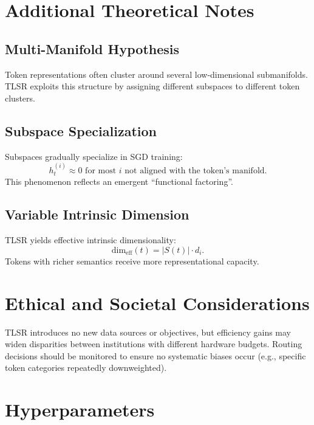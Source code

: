 \documentclass{article}
\theoremstyle{plain}
\theoremstyle{definition}
\theoremstyle{remark}
\begin{document}
\section{Additional Theoretical Notes}

\subsection{Multi-Manifold Hypothesis}
Token representations often cluster around several 
low-dimensional submanifolds.
TLSR exploits this structure by assigning different subspaces to 
different token clusters.

\subsection{Subspace Specialization}
Subspaces gradually specialize in SGD training:
\[
h_t^{(i)} \approx 0 \text{ for most $i$ not aligned with the token's manifold}.
\]
This phenomenon reflects an emergent “functional factoring”.

\subsection{Variable Intrinsic Dimension}
TLSR yields effective intrinsic dimensionality:
\[
\mathrm{dim}_{\mathrm{eff}}(t)
= |S(t)|\cdot d_i.
\]
Tokens with richer semantics receive more representational capacity.

\section{Ethical and Societal Considerations}

TLSR introduces no new data sources or objectives, but efficiency gains
may widen disparities between institutions with different hardware budgets.
Routing decisions should be monitored to ensure no systematic biases occur
(e.g., specific token categories repeatedly downweighted).

\section{Hyperparameters}
\end{document}
